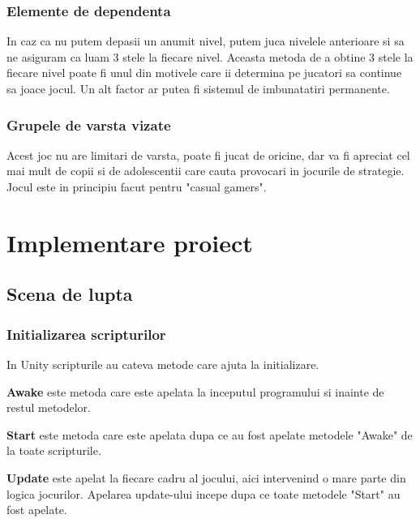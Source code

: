 \documentclass[12pt, a4paper]{article}
\begin{document}
	
	
	\subsubsection{Elemente de dependenta}
	
	In caz ca nu putem depasii un anumit nivel, putem juca nivelele anterioare si sa ne asiguram ca luam 3 stele la fiecare nivel. Aceasta metoda de a obtine 3 stele la fiecare nivel poate fi unul din motivele care ii determina pe jucatori sa continue sa joace jocul. Un alt factor ar putea fi sistemul de imbunatatiri permanente.
	
	
	
	\subsubsection{Grupele de varsta vizate}
	
	Acest joc nu are limitari de varsta, poate fi jucat de oricine, dar va fi apreciat cel mai mult de copii si de adolescentii care cauta provocari in jocurile de strategie. Jocul este in principiu facut pentru "casual gamers".
	
	
	
	\section{Implementare proiect}
	
	\subsection{Scena de lupta}
	
	\subsubsection{Initializarea scripturilor}
	
	In Unity scripturile au cateva metode care ajuta la initializare.
	
	\textbf{Awake} este metoda care este apelata la inceputul programului si inainte de restul metodelor.
	
	\textbf{Start} este metoda care este apelata dupa ce au fost apelate metodele "Awake" de la toate scripturile.
	
	\textbf{Update} este apelat la fiecare cadru al jocului, aici intervenind o mare parte din logica jocurilor. Apelarea update-ului incepe dupa ce toate metodele "Start" au fost apelate.
	
\end{document}
